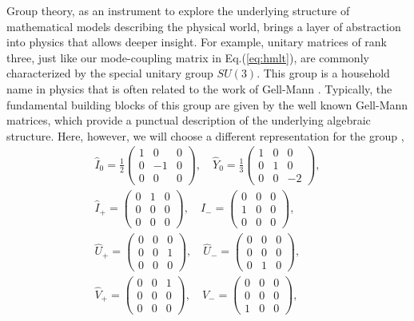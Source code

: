 \documentclass[9pt,twocolumn,twoside]{osajnl}
\begin{document}
Group theory, as an instrument to explore the underlying structure of mathematical models describing the physical world, brings a layer of abstraction into physics that allows deeper insight.
For example, unitary matrices of rank three, just like our mode-coupling matrix in Eq.(\ref{eq:hmlt}), are commonly characterized by the special unitary group $SU(3)$.
This group is a household name in physics that is often related to the work of Gell-Mann \cite{GellMann1961}.
Typically, the fundamental building blocks of this group are given by the well known Gell-Mann matrices, which provide a punctual description of the underlying algebraic structure.
Here, however, we will choose a different representation for the group \cite{Ticciati1999}, 
\begin{eqnarray}
\hat{I}_{0} = \frac{1}{2} \left( \begin{array}{ccc} 1&0&0\\0&-1&0\\0&0&0 \end{array}\right), \quad  
\hat{Y}_{0} = \frac{1}{3} \left( \begin{array}{ccc} 
1&0&0\\0&1&0\\0&0&-2    \end{array}\right), \nonumber\\
\hat{I}_{+} = \left( \begin{array}{ccc} 0&1&0\\0&0&0\\0&0&0 \end{array}\right), \quad 
\hat{I}_{-} = \left( \begin{array}{ccc} 0&0&0\\1&0&0\\0&0&0 \end{array}\right), \quad \nonumber\\
\hat{U}_{+} = \left( \begin{array}{ccc} 0&0&0\\0&0&1\\0&0&0 \end{array}\right), \quad 
\hat{U}_{-} = \left( \begin{array}{ccc} 0&0&0\\0&0&0\\0&1&0 \end{array}\right), \quad \nonumber \\
\hat{V}_{+} = \left( \begin{array}{ccc} 0&0&1\\0&0&0\\0&0&0 \end{array}\right), \quad 
\hat{V}_{-} = \left( \begin{array}{ccc} 0&0&0\\0&0&0\\1&0&0 \end{array}\right), \label{eq:gens}
\end{eqnarray}
\end{document}
